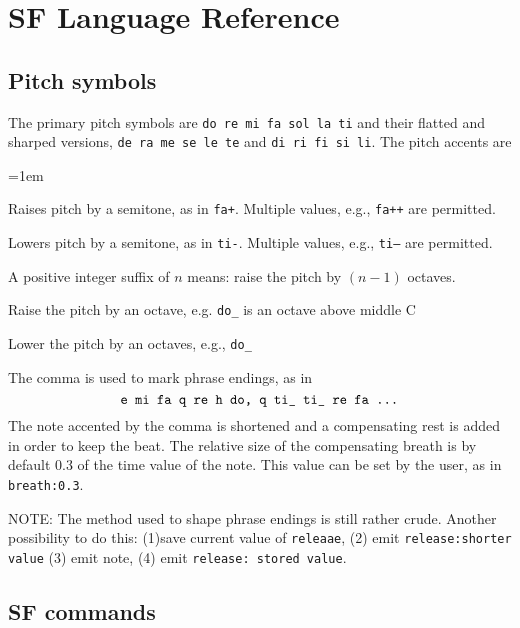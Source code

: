 \documentclass[11pt]{amsart}
\begin{document}
\section{SF Language Reference}
\label{sec:SFLR}

\subsection{Pitch symbols}

The primary pitch symbols are {\tt do re mi fa sol la ti} and their
flatted and sharped versions, {\tt de ra me se le te} and
{\tt di ri fi si li}.  The pitch accents are

\begin{description}
\parskip=1em

\item[{\tt +}]  Raises pitch by a semitone, as in {\tt fa+}. Multiple
values, e.g., {\tt fa++} are permitted.

\item[{\tt -}]  Lowers pitch by a semitone, as in {\tt ti-}. Multiple
values, e.g., {\tt ti--} are permitted.

\item[{\tt <n>} ] A positive integer suffix of $n$ means: raise the pitch
by $(n-1)$ octaves.

\item[{\tt\^{}}]  Raise the pitch
by an octave, e.g. {\tt do\_} is an octave above middle C


\item[{\tt\_{}} ] Lower the pitch
by an octaves, e.g., {\tt do\_ }

\item[{\tt ,}]   The comma is used to mark phrase endings, as in 
\[
  \hbox{{\tt e mi fa q re h do, q ti\_ ti\_ re fa ...}}
\]
The note accented by the comma is shortened and a compensating rest is added
in order to keep the beat.  The relative size of the compensating breath
is by default 0.3 of the time value of the note.  This value can be set
by the user, as in {\tt breath:0.3}.  

\end{description}

NOTE:  The method used to shape phrase endings is still rather crude.  Another 
possibility to do this: (1)save current value of {\tt releaae}, 
(2) emit {\tt release:shorter value} (3) emit note, (4) emit {\tt release: stored value}.



\subsection{SF commands}
\end{document}
